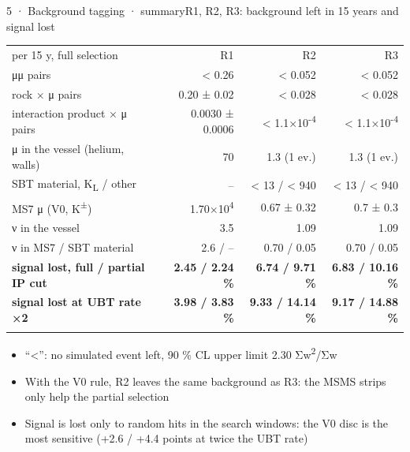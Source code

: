 \begin{btframe}{5 · Background tagging · summary}{R1, R2, R3: background left in 15 years and signal lost}
{\fontsize{5.31pt}{6.90pt}\selectfont\setlength{\tabcolsep}{3.72pt}\renewcommand{\arraystretch}{1.42}
\begin{tabularx}{\linewidth}{>{\raggedright\arraybackslash}Xrrr}
\textcolor{muted}{per 15 y, full selection} & \textcolor{muted}{R1} & \textcolor{muted}{R2} & \textcolor{muted}{R3} \\\headrule
μμ pairs & < 0.26 & < 0.052 & < 0.052 \\\rowrule
rock × μ pairs & 0.20 ± 0.02 & < 0.028 & < 0.028 \\\rowrule
interaction product × μ pairs & 0.0030 ± 0.0006 & < 1.1×10\textsuperscript{-4} & < 1.1×10\textsuperscript{-4} \\\rowrule
μ in the vessel (helium, walls) & 70 & 1.3 (1 ev.) & 1.3 (1 ev.) \\\rowrule
SBT material, K\textsubscript{L} / other & – & < 13 / < 940 & < 13 / < 940 \\\rowrule
MS7 μ (V0, K\textsuperscript{±}) & 1.70×10\textsuperscript{4} & 0.67 ± 0.32 & 0.7 ± 0.3 \\\rowrule
ν in the vessel & 3.5 & 1.09 & 1.09 \\\rowrule
ν in MS7 / SBT material & 2.6 / – & 0.70 / 0.05 & 0.70 / 0.05 \\\rowrule
\rowcolor{tint}\bfseries signal lost, full / partial IP cut & \bfseries 2.45 / 2.24 \% & \bfseries 6.74 / 9.71 \% & \bfseries 6.83 / 10.16 \% \\\rowrule
\rowcolor{tint}\bfseries signal lost at UBT rate ×2 & \bfseries 3.98 / 3.83 \% & \bfseries 9.33 / 14.14 \% & \bfseries 9.17 / 14.88 \% \\\rowrule
\end{tabularx}\par}
\vspace{2.46pt}
{\fontsize{6.15pt}{8.60pt}\selectfont
\begin{itemize}
  \item “<”: no simulated event left, 90 \% CL upper limit 2.30 Σw\textsuperscript{2}/Σw
  \item With the V0 rule, R2 leaves the same background as R3: the MSMS strips only help the partial selection
  \item Signal is lost only to random hits in the search windows: the V0 disc is the most sensitive (+2.6 / +4.4 points at twice the UBT rate)
\end{itemize}}
\end{btframe}

